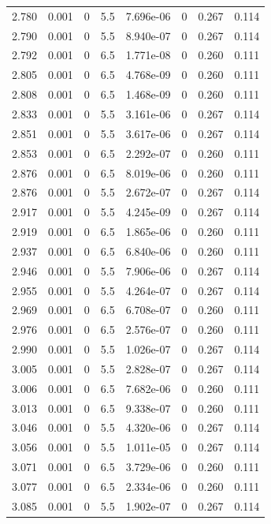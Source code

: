 \documentclass[preview]{standalone}
\begin{document}
{{{{{{{\begin{tabular}{L{1.2cm}C{1.2cm} C{0.3cm}C{0.5cm} C{1.4cm}C{1.4cm} C{1.4cm}C{1.4cm}}
  2.780  &  0.001  & 0     & 5.5 &  7.696e-06  & 0  & 0.267 &  0.114   \\ 
  2.790  &  0.001  & 0     & 5.5 &  8.940e-07  & 0  & 0.267 &  0.114   \\ 
  2.792  &  0.001  & 0     & 6.5 &  1.771e-08  & 0  & 0.260 &  0.111   \\ 
  2.805  &  0.001  & 0     & 6.5 &  4.768e-09  & 0  & 0.260 &  0.111   \\ 
  2.808  &  0.001  & 0     & 6.5 &  1.468e-09  & 0  & 0.260 &  0.111   \\ 
  2.833  &  0.001  & 0     & 5.5 &  3.161e-06  & 0  & 0.267 &  0.114   \\ 
  2.851  &  0.001  & 0     & 5.5 &  3.617e-06  & 0  & 0.267 &  0.114   \\ 
  2.853  &  0.001  & 0     & 6.5 &  2.292e-07  & 0  & 0.260 &  0.111   \\ 
  2.876  &  0.001  & 0     & 6.5 &  8.019e-06  & 0  & 0.260 &  0.111   \\ 
  2.876  &  0.001  & 0     & 5.5 &  2.672e-07  & 0  & 0.267 &  0.114   \\ 
  2.917  &  0.001  & 0     & 5.5 &  4.245e-09  & 0  & 0.267 &  0.114   \\ 
  2.919  &  0.001  & 0     & 6.5 &  1.865e-06  & 0  & 0.260 &  0.111   \\ 
  2.937  &  0.001  & 0     & 6.5 &  6.840e-06  & 0  & 0.260 &  0.111   \\ 
  2.946  &  0.001  & 0     & 5.5 &  7.906e-06  & 0  & 0.267 &  0.114   \\ 
  2.955  &  0.001  & 0     & 5.5 &  4.264e-07  & 0  & 0.267 &  0.114   \\ 
  2.969  &  0.001  & 0     & 6.5 &  6.708e-07  & 0  & 0.260 &  0.111   \\ 
  2.976  &  0.001  & 0     & 6.5 &  2.576e-07  & 0  & 0.260 &  0.111   \\ 
  2.990  &  0.001  & 0     & 5.5 &  1.026e-07  & 0  & 0.267 &  0.114   \\ 
  3.005  &  0.001  & 0     & 5.5 &  2.828e-07  & 0  & 0.267 &  0.114   \\ 
  3.006  &  0.001  & 0     & 6.5 &  7.682e-06  & 0  & 0.260 &  0.111   \\ 
  3.013  &  0.001  & 0     & 6.5 &  9.338e-07  & 0  & 0.260 &  0.111   \\ 
  3.046  &  0.001  & 0     & 5.5 &  4.320e-06  & 0  & 0.267 &  0.114   \\ 
  3.056  &  0.001  & 0     & 5.5 &  1.011e-05  & 0  & 0.267 &  0.114   \\ 
  3.071  &  0.001  & 0     & 6.5 &  3.729e-06  & 0  & 0.260 &  0.111   \\ 
  3.077  &  0.001  & 0     & 6.5 &  2.334e-06  & 0  & 0.260 &  0.111   \\ 
  3.085  &  0.001  & 0     & 5.5 &  1.902e-07  & 0  & 0.267 &  0.114   \\ 
\hline 
\end{tabular} 

}}}}}}}
\end{document}
